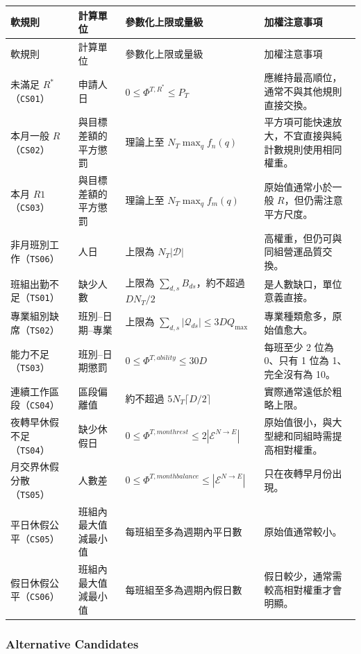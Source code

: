 \documentclass[12pt]{article}
\begin{document}
\small
\begin{longtable}{p{2.8cm}p{2.5cm}p{4.5cm}p{4.3cm}}
  \toprule
  軟規則 & 計算單位 & 參數化上限或量級 & 加權注意事項 \\
  \midrule
  \endfirsthead
  \toprule
  軟規則 & 計算單位 & 參數化上限或量級 & 加權注意事項 \\
  \midrule
  \endhead
  未滿足 \(R^*\)（\texttt{CS01}） & 申請人日 & \(0\leq\Phi^{T,R^*}\leq P_T\) & 應維持最高順位，通常不與其他規則直接交換。 \\
  本月一般 \(R\)（\texttt{CS02}） & 與目標差額的平方懲罰 & 理論上至 \(N_T\max_q f_n(q)\) & 平方項可能快速放大，不宜直接與純計數規則使用相同權重。 \\
  本月 \(R1\)（\texttt{CS03}） & 與目標差額的平方懲罰 & 理論上至 \(N_T\max_q f_m(q)\) & 原始值通常小於一般 \(R\)，但仍需注意平方尺度。 \\
  非月班別工作（\texttt{TS06}） & 人日 & 上限為 \(N_T|\mathcal{D}|\) & 高權重，但仍可與同組營運品質交換。 \\
  班組出勤不足（\texttt{TS01}） & 缺少人數 & 上限為 \(\sum_{d,s}B_{ds}\)，約不超過 \(DN_T/2\) & 是人數缺口，單位意義直接。 \\
  專業組別缺席（\texttt{TS02}） & 班別--日期--專業 & 上限為 \(\sum_{d,s}|\mathcal{Q}_{ds}|\leq3DQ_{\max}\) & 專業種類愈多，原始值愈大。 \\
  能力不足（\texttt{TS03}） & 班別--日期懲罰 & \(0\leq\Phi^{T,ability}\leq30D\) & 每班至少 2 位為 0、只有 1 位為 1、完全沒有為 10。 \\
  連續工作區段（\texttt{CS04}） & 區段偏離值 & 約不超過 \(5N_T\lceil D/2\rceil\) & 實際通常遠低於粗略上限。 \\
  夜轉早休假不足（\texttt{TS04}） & 缺少休假日 & \(0\leq\Phi^{T,monthrest}\leq2|\mathcal{E}^{N\rightarrow E}|\) & 原始值很小，與大型總和同組時需提高相對權重。 \\
  月交界休假分散（\texttt{TS05}） & 人數差 & \(0\leq\Phi^{T,monthbalance}\leq|\mathcal{E}^{N\rightarrow E}|\) & 只在夜轉早月份出現。 \\
  平日休假公平（\texttt{CS05}） & 班組內最大值減最小值 & 每班組至多為週期內平日數 & 原始值通常較小。 \\
  假日休假公平（\texttt{CS06}） & 班組內最大值減最小值 & 每班組至多為週期內假日數 & 假日較少，通常需較高相對權重才會明顯。 \\
  \bottomrule
\end{longtable}
\normalsize

\subsubsection{Alternative Candidates}
\end{document}
